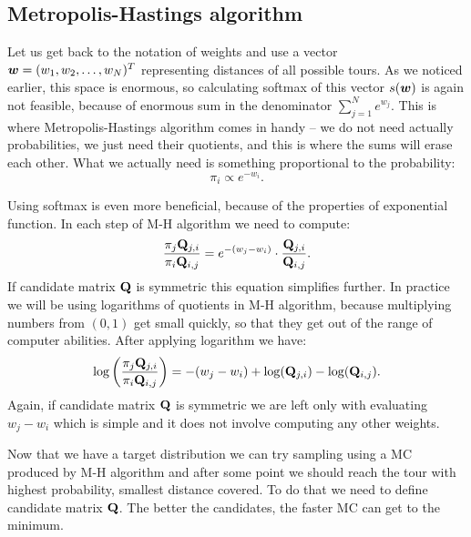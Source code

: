 \subsection{Metropolis-Hastings algorithm}
	Let us get back to the notation of weights and use a vector $\bm{w} = (w_1, w_2, \ldots, w_N)^T$ representing distances of all possible tours. As we noticed earlier, this space is enormous, so calculating softmax of this vector $s(\bm{w})$ is again not feasible, because of enormous sum in the denominator $\sum_{j=1}^{N} e^{w_j}$. This is where Metropolis-Hastings algorithm comes in handy -- we do not need actually probabilities, we just need their quotients, and this is where the sums will erase each other. What we actually need is something proportional to the probability:
	\begin{equation*}
		\pi_i \propto e^{-w_i}.
	\end{equation*}
	
	
	
	Using softmax is even more beneficial, because of the properties of exponential function. In each step of M-H algorithm we need to compute:
	\begin{equation*}
		\frac{\pi_j \mathbf{Q}_{j,i}}{\pi_i \mathbf{Q}_{i,j}} = e^{-(w_j-w_i)} \cdot \frac{\mathbf{Q}_{j,i}}{\mathbf{Q}_{i,j}}.
	\end{equation*}
	If candidate matrix $\mathbf{Q}$ is symmetric this equation simplifies further. In practice we will be using logarithms of quotients in M-H algorithm, because multiplying numbers from $(0,1)$ get small quickly, so that they get out of the range of computer abilities. After applying logarithm we have:
	\begin{equation*}
		\log \left( \frac{\pi_j \mathbf{Q}_{j,i}}{\pi_i \mathbf{Q}_{i,j}} \right) = -(w_j-w_i) + \log(\mathbf{Q}_{j,i}) - \log(\mathbf{Q}_{i,j}).
	\end{equation*}
	Again, if candidate matrix $\mathbf{Q}$ is symmetric we are left only with evaluating $w_j-w_i$ which is simple and it does not involve computing any other weights.
	
	Now that we have a target distribution we can try sampling using a MC produced by M-H algorithm and after some point we should reach the tour with highest probability, \ie smallest distance covered. To do that we need to define candidate matrix $\mathbf{Q}$. The better the candidates, the faster MC can get to the minimum.

